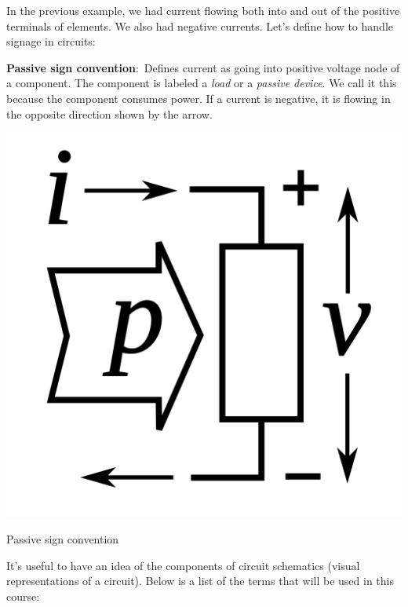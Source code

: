 \documentclass[nobib]{tufte-handout}
\newcommand{\defn}[2]{\noindent\textbf{#1}:\ #2}
\begin{document}
In the previous example, we had current flowing
both into and out of the positive terminals
of elements. We also had negative currents. Let's define 
how to handle signage in circuits:

\defn{Passive sign convention}{Defines current as going into 
positive voltage node of a component.} The component
is labeled a \emph{load} or a \emph{passive device}.
We call it this because the component
consumes power. If a current is negative,
it is flowing in the opposite direction shown by the
arrow.
\begin{marginfigure}
    \centering
    \includegraphics{images/Passive_sign_convention.svg.png}
    \caption{Passive sign convention}
    \label{fig:psc} 
\end{marginfigure}
It's useful to have an idea of the components of circuit
schematics (visual representations of a circuit). Below is a list 
of the terms that will be used in this course:
\end{document}
